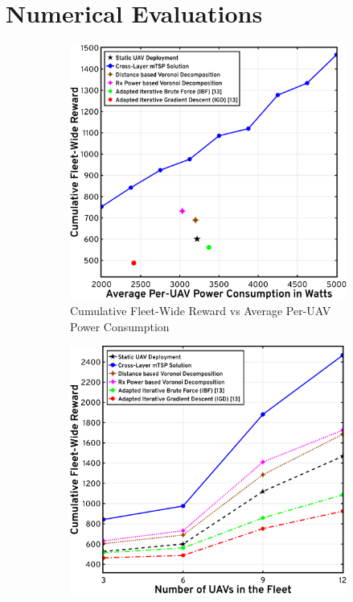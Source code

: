 \documentclass[10pt, twocolumn]{IEEEtran}
\begin{document}
\section{Numerical Evaluations}\label{S4}
\begin{figure}[t]
    \centering
    \begin{subfigure}{0.492\linewidth}
        \centering
        \includegraphics[width=0.8615\linewidth]{figs/reward_vs_average_power.png}
        \vspace{-1mm}
        \caption{Cumulative Fleet-Wide Reward vs Average Per-UAV Power Consumption~\cite{Source_Code}}
        \label{F4a}
    \end{subfigure}
    \begin{subfigure}{0.501\linewidth}
        \centering
        \includegraphics[width=0.8615\linewidth]{figs/reward_vs_number_of_uavs.png}

\end{subfigure}
\end{figure}
\end{document}
